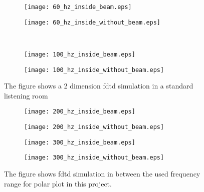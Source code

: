 \begin{figure}[H]
\begin{subfigure}[c]{0.5\textwidth}
\texttt{[image: 60\_hz\_inside\_beam.eps]}
\label{fig:Indoor_simulation_60_on}
\end{subfigure}
\begin{subfigure}[c]{0.5\textwidth}
\texttt{[image: 60\_hz\_inside\_without\_beam.eps]}
\label{fig:Indoor_simulation_60_off}
\end{subfigure}\\
\hspace{0.1\textheight}
\begin{subfigure}[c]{0.5\textwidth}
\texttt{[image: 100\_hz\_inside\_beam.eps]}
\label{fig:Indoor_simulation_100_on}
\end{subfigure}
\begin{subfigure}[c]{0.5\textwidth}
\texttt{[image: 100\_hz\_inside\_without\_beam.eps]}
\label{fig:Indoor_simulation_100_off}
\end{subfigure}
\caption{The figure shows a 2 dimension \gls{fdtd} simulation in a standard listening room}
		\label{fig:Indoor_simulation_60_100}
\end{figure}


\begin{figure}[H]
\begin{subfigure}[c]{0.5\textwidth}
\texttt{[image: 200\_hz\_inside\_beam.eps]}
\label{fig:Indoor_simulation_200_on}
\end{subfigure}
\begin{subfigure}[c]{0.5\textwidth}
\texttt{[image: 200\_hz\_inside\_without\_beam.eps]}
\label{fig:Indoor_simulation_200_off}
\end{subfigure}
\begin{subfigure}[c]{0.5\textwidth}
\texttt{[image: 300\_hz\_inside\_beam.eps]}
\label{fig:Indoor_simulation_300_on}
\end{subfigure}
\begin{subfigure}[c]{0.5\textwidth}
\texttt{[image: 300\_hz\_inside\_without\_beam.eps]}
\label{fig:Indoor_simulation_300_off}
\end{subfigure}
\caption{The figure shows \gls{fdtd} simulation in between the used frequency range for polar plot in this project.}
		\label{fig:Indoor_simulation_200_300}
\end{figure}

